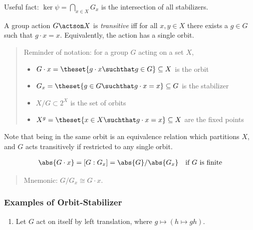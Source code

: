 Useful fact: \(\ker \psi = \bigcap_{x\in X} G_x\) is the intersection of
all stabilizers.

\begin{definition}

A group action \(G\actson X\) is \emph{transitive} iff for all
\(x, y\in X\) there exists a \(g\in G\) such that \(g\cdot x = x\).
Equivalently, the action has a single orbit.

\end{definition}

\begin{quote}
Reminder of notation: for a group \(G\) acting on a set \(X\),

\begin{itemize}
\item
  \(G\cdot x = \theset{g\cdot x \suchthat g\in G} \subseteq X\) is the
  orbit
\item
  \(G_x = \theset{g\in G \suchthat g\cdot x = x} \subseteq G\) is the
  stabilizer
\item
  \(X/G \subset 2^X\) is the set of orbits
\item
  \(X^g = \theset{x\in X \suchthat g\cdot x = x} \subseteq X\) are the
  fixed points
\end{itemize}
\end{quote}

Note that being in the same orbit is an equivalence relation which
partitions \(X\), and \(G\) acts transitively if restricted to any
single orbit.

\begin{theorem}

\begin{align*}
\abs{G\cdot x} = [G: G_x] = \abs{G} / \abs{G_x}\quad \text{if $G$ is finite}
\end{align*}

\end{theorem}

\begin{quote}
Mnemonic: \(G/G_x \cong G\cdot x\).
\end{quote}

\hypertarget{examples-of-orbit-stabilizer}{%
\subsubsection{Examples of
Orbit-Stabilizer}\label{examples-of-orbit-stabilizer}}

\begin{enumerate}
\def\labelenumi{\arabic{enumi}.}
\tightlist
\item
  Let \(G\) act on itself by left translation, where
  \(g \mapsto (h\mapsto gh)\).
\end{enumerate}

